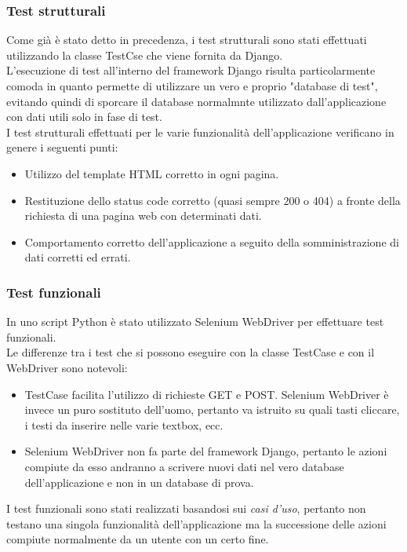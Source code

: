 \documentclass[10pt,a4paper]{article}
\begin{document}
	\subsubsection{Test strutturali}
	Come già è stato detto in precedenza, i test strutturali sono stati effettuati utilizzando la classe TestCse che viene fornita da Django. \\
	L'esecuzione di test all'interno del framework Django risulta particolarmente comoda in quanto permette di utilizzare un vero e proprio "database di test", evitando quindi di sporcare il database normalmnte utilizzato dall'applicazione con dati utili solo in fase di test. \\
	I test strutturali effettuati per le varie funzionalità dell'applicazione verificano in genere i seguenti punti:
	\begin{itemize}
		\item Utilizzo del template HTML corretto in ogni pagina.
		\item Restituzione dello status code corretto (quasi sempre 200 o 404) a fronte della richiesta di una pagina web con determinati dati.
		\item Comportamento corretto dell'applicazione a seguito della somministrazione di dati corretti ed errati.
	\end{itemize}

	\subsubsection{Test funzionali}
	In uno script Python è stato utilizzato Selenium WebDriver per effettuare test funzionali. \\
	Le differenze tra i test che si possono eseguire con la classe TestCase e con il WebDriver sono notevoli:
	\begin{itemize}
		\item TestCase facilita l'utilizzo di richieste GET e POST. Selenium WebDriver è invece un puro sostituto dell'uomo, pertanto va istruito su quali tasti cliccare, i testi da inserire nelle varie textbox, ecc.
		\item Selenium WebDriver non fa parte del framework Django, pertanto le azioni compiute da esso andranno a scrivere nuovi dati nel vero database dell'applicazione e non in un database di prova.
	\end{itemize}
	I test funzionali sono stati realizzati basandosi sui \textit{casi d'uso}, pertanto non testano una singola funzionalità dell'applicazione ma la successione delle azioni compiute normalmente da un utente con un certo fine.
	
\end{document}
